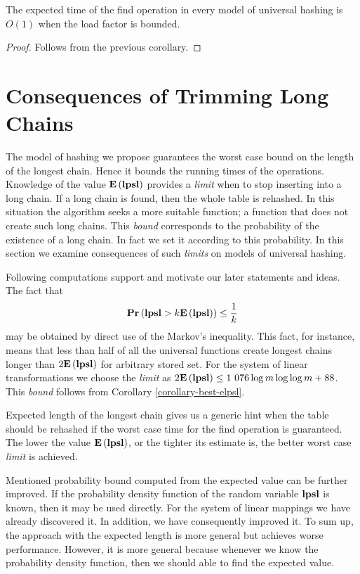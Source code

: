 \begin{corollary}
\label{corollary-find-time}
The expected time of the find operation in every model of universal hashing is $O(1)$ when the load factor is bounded.
\end{corollary}
\begin{proof}
Follows from the previous corollary.
\end{proof}

\section{Consequences of Trimming Long Chains}
The model of hashing we propose guarantees the worst case bound on the length of the longest chain. Hence it bounds the running times of the operations. Knowledge of the value $\mathbf{E}\left(\mathbf{lpsl}\right)$ provides a \emph{limit} when to stop inserting into a long chain. If a long chain is found, then the whole table is rehashed. In this situation the algorithm seeks a more suitable function; a function that does not create such long chains. This \emph{bound} corresponds to the probability of the existence of a long chain. In fact we set it according to this probability. In this section we examine consequences of such \emph{limits} on models of universal hashing.

Following computations support and motivate our later statements and ideas. The fact that \[ \mathbf{Pr}\left(\mathbf{lpsl} > k \mathbf{E}\left(\mathbf{lpsl}\right)\right) \leq \frac{1}{k} \] may be obtained by direct use of the Markov's inequality. This fact, for instance, means that less than half of all the universal functions create longest chains longer than $2 \mathbf{E}\left(\mathbf{lpsl}\right)$ for arbitrary stored set. For the system of linear transformations we choose the \emph{limit} as $2\mathbf{E}\left(\mathbf{lpsl}\right) \leq \text{1 076} \log m \log \log m + 88$. This \emph{bound} follows from Corollary \ref{corollary-best-elpsl}.

Expected length of the longest chain gives us a generic hint when the table should be rehashed if the worst case time for the find operation is guaranteed. The lower the value $\mathbf{E}\left(\mathbf{lpsl}\right)$, or the tighter its estimate is, the better worst case \emph{limit} is achieved.

Mentioned probability bound computed from the expected value can be further improved. If the probability density function of the random variable $\mathbf{lpsl}$ is known, then it may be used directly. For the system of linear mappings we have already discovered it. In addition, we have consequently improved it. To sum up, the approach with the expected length is more general but achieves worse performance. However, it is more general because whenever we know the probability density function, then we should able to find the expected value.

